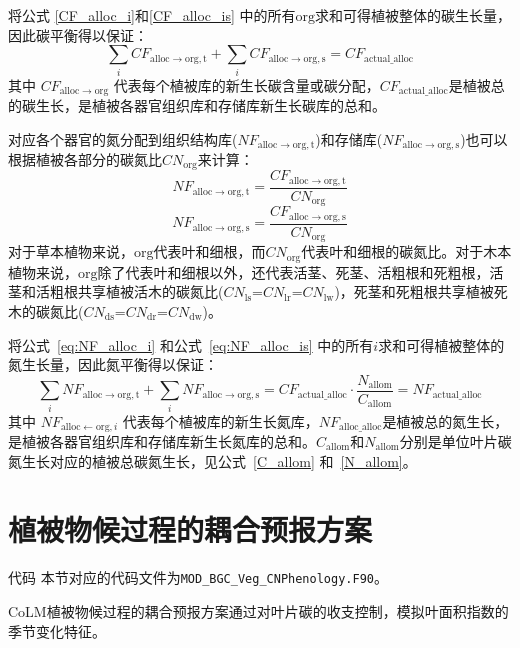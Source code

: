将公式 \eqref{CF_alloc_i}和\eqref{CF_alloc_is} 中的所有${\mathrm {org}}$求和可得植被整体的碳生长量，因此碳平衡得以保证：
\begin{equation}
  \sum_{i}{CF_{\mathrm{alloc\rightarrow org,t}}}+\sum_{i}{CF_{\mathrm{alloc\rightarrow org,s}}}=CF_{\mathrm{actual\_alloc}}
\end{equation}
其中 $CF_{\mathrm{alloc\rightarrow org}}$ 代表每个植被库的新生长碳含量或碳分配，$CF_{\mathrm{actual\_alloc}}$是植被总的碳生长，是植被各器官组织库和存储库新生长碳库的总和。


对应各个器官的氮分配到组织结构库($NF_{\mathrm{alloc\rightarrow org,t}}$)和存储库($NF_{\mathrm{alloc\rightarrow org,s}}$)也可以根据植被各部分的碳氮比$CN_{\mathrm {org}}$来计算：
\begin{equation}\label{eq:NF_alloc_i}
  NF_{\mathrm{alloc\rightarrow org,t}} = \frac{CF_{\mathrm{alloc\rightarrow org,t}}}{CN_{\mathrm{org}}}
\end{equation}
\begin{equation}\label{eq:NF_alloc_is}
  NF_{\mathrm{alloc\rightarrow org,s}} = \frac{CF_{\mathrm{alloc\rightarrow org,s}}}{CN_{\mathrm{org}}}
\end{equation}
对于草本植物来说，${\mathrm {org}}$代表叶和细根，而$CN_{\mathrm{org}}$代表叶和细根的碳氮比。对于木本植物来说，${\mathrm {org}}$除了代表叶和细根以外，还代表活茎、死茎、活粗根和死粗根，活茎和活粗根共享植被活木的碳氮比($CN_{\mathrm{ls}}$=$CN_{\mathrm{lr}}$=$CN_{\mathrm{lw}}$)，死茎和死粗根共享植被死木的碳氮比($CN_{\mathrm{ds}}$=$CN_{\mathrm{dr}}$=$CN_{\mathrm{dw}}$)。


将公式~\eqref{eq:NF_alloc_i} 和公式~\eqref{eq:NF_alloc_is} 中的所有${i}$求和可得植被整体的氮生长量，因此氮平衡得以保证：
\begin{equation}
  \sum_{i}{NF_{\mathrm{alloc\rightarrow org,t}}}+\sum_{i}{NF_{\mathrm{alloc\rightarrow org,s}}}=CF_{\mathrm{actual\_alloc}}\cdot \frac{N_{\mathrm{allom}}}{C_{\mathrm{allom}}}=NF_{\mathrm{actual\_alloc}}
\end{equation}
其中 $NF_{\mathrm{alloc\gets org},i}$ 代表每个植被库的新生长氮库，$NF_{\mathrm{alloc\_alloc}}$是植被总的氮生长，是植被各器官组织库和存储库新生长氮库的总和。$C_{\mathrm{allom}}$和$N_{\mathrm{allom}}$分别是单位叶片碳氮生长对应的植被总碳氮生长，见公式~\eqref{C_allom} 和~\eqref{N_allom}。


\section{植被物候过程的耦合预报方案}\label{植被物候过程的耦合预报方案}
\begin{mymdframed}{代码}
  本节对应的代码文件为\texttt{MOD\_BGC\_Veg\_CNPhenology.F90}。
\end{mymdframed}
CoLM植被物候过程的耦合预报方案通过对叶片碳的收支控制，模拟叶面积指数的季节变化特征。


